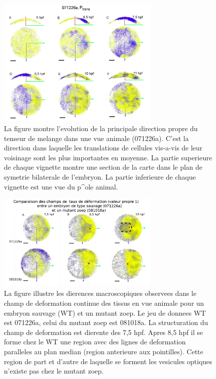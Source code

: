 \begin{figure}
\begin{center}
\includegraphics[width=0.7\textwidth]{../../images/Reconstruction/these_lombardot/p211_mix_tensor.png}
\end{center}
\caption{La figure montre l'evolution de la principale direction propre du tenseur de melange dans une vue animale (071226a). C'est la direction dans laquelle les translations de cellules vis-a-vis de leur voisinage sont les plus importantes en moyenne. La partie superieure de chaque vignette montre une section de la carte dans le plan de symetrie bilaterale de l'embryon. La partie inferieure de chaque vignette est une vue du p^ole animal.}
\label{these_lombardot_p211_mix_tensor}
\end{figure}
\begin{figure}
\begin{center}
\includegraphics[width=0.7\textwidth]{../../images/Reconstruction/these_lombardot/p237_deformation_rate_comparison_zoep.png}
\end{center}
\caption{La figure illustre les dierences macroscopiques observees dans le champ de deformation continue des tissus en vue animale pour un embryon sauvage (WT) et un mutant zoep. Le jeu de donnees WT est 071226a, celui du mutant zoep est 081018a. La structuration du champ de deformation est dierente des 7,5 hpf. Apres 8,5 hpf il se forme chez le WT une region avec des lignes de deformation paralleles au plan median (region anterieure aux pointilles). Cette region de part et d'autre de laquelle se forment les vesicules optiques n'existe pas chez le mutant zoep.}
\label{these_lombardot_p237_deformation_rate_comparison_zoep}
\end{figure}

